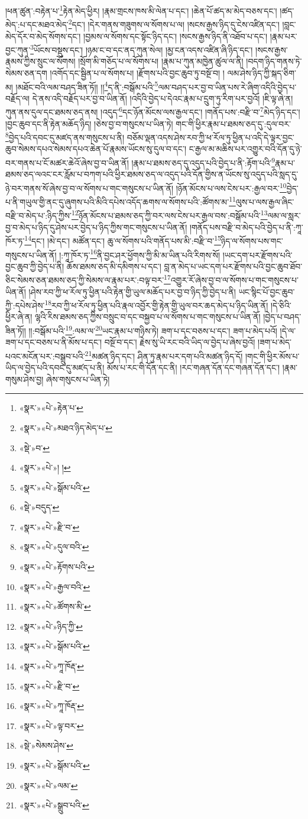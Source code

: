 །ཕན་ཚུན་:བརྟེན་པ་\footnote{«སྣར་»«པེ་»རྟེན་པ་}རྟེན་མེད་ཕྱིར། །རྣམ་གྲངས་ཁས་མི་ལེན་པ་དང་། །ཆེན་པོ་ཚད་མ་མེད་བཅས་དང་། །ཚད་མེད་:པ་དང་མཐའ་མེད་\footnote{«སྣར་»«པེ་»མཐའ་ཉིད་མེད་པ་}དང་། །དེར་གནས་གཟུགས་ལ་སོགས་པ་ལ། །སངས་རྒྱས་ཉིད་དུ་ངེས་འཛིན་དང་། །བླང་མེད་དོར་བ་མེད་སོགས་དང་། །བྱམས་ལ་སོགས་དང་སྟོང་ཉིད་དང་། །སངས་རྒྱས་ཉིད་ནི་འཐོབ་པ་དང་། །རྣམ་པར་བྱང་ཀུན་\footnote{«སྡེ་»བ་}ཡོངས་བསྡུས་དང་། །ཉམ་ང་བ་དང་ནད་ཀུན་སེལ། །མྱ་ངན་འདས་འཛིན་ཞི་ཉིད་དང་། །སངས་རྒྱས་རྣམས་ཀྱིས་སྲུང་ལ་སོགས། །སྲོག་མི་གཅོད་པ་ལ་སོགས་པ། །རྣམ་པ་ཀུན་མཁྱེན་ཚུལ་ལ་ནི། །བདག་ཉིད་གནས་ཏེ་སེམས་ཅན་དག །འགོད་དང་སྦྱིན་པ་ལ་སོགས་པ། །རྫོགས་པའི་བྱང་ཆུབ་ཏུ་བསྔོ་བ། །
ལམ་ཤེས་ཉིད་ཀྱི་སྐད་ཅིག་མ། །མཐོང་བའི་ལམ་བཤད་ཟིན་ཏོ།། །།\footnote{«སྣར་»«པེ་»། །}ད་ནི་:བསྒོམ་པའི་\footnote{«སྣར་»«པེ་»སྒོམ་པའི་}ལམ་བཤད་པར་བྱ་བ་ཡིན་པས་རེ་ཞིག་འདིའི་བྱེད་པ་བརྗོད་ལ། དེ་ནས་འདི་བརྗོད་པར་བྱ་བ་ཡིན་ནོ། །འདིའི་བྱེད་པ་དེའང་རྣམ་པ་དྲུག་ཏུ་རིག་པར་བྱའོ། །ཇི་ལྟ་ཞེ་ན། ཀུན་ནས་དུལ་དང་ཐམས་ཅད་ནས། །འདུད་\footnote{«སྡེ་»བདུད་}དང་ཉོན་མོངས་ལས་རྒྱལ་དང་། །གནོད་པས་:བརྫི་བ་\footnote{«སྣར་»«པེ་»རྫི་བ་}མེད་ཉིད་དང་། །བྱང་ཆུབ་དང་ནི་རྟེན་མཆོད་ཉིད། །ཅེས་བྱ་བ་གསུངས་པ་ཡིན་ཏེ། གང་གི་ཕྱིར་རྣམ་པ་ཐམས་ཅད་དུ་:དུལ་བར་\footnote{«སྣར་»«པེ་»དུལ་བའི་}བྱེད་པའི་དབང་དུ་མཛད་ནས་གསུངས་པ་ནི། བཅོམ་ལྡན་འདས་ཤེས་རབ་ཀྱི་ཕ་རོལ་ཏུ་ཕྱིན་པ་འདི་དེ་ལྟར་བྱང་ཆུབ་སེམས་དཔའ་སེམས་དཔའ་ཆེན་པོ་རྣམས་ཡོངས་སུ་དུལ་བ་དང་། ང་རྒྱལ་མ་མཆིས་པར་འགྱུར་བའི་དོན་དུ་ཉེ་བར་གནས་པ་ངོ་མཚར་ཆེའོ་ཞེས་བྱ་བ་ཡིན་ནོ། །རྣམ་པ་ཐམས་ཅད་དུ་འདུད་པའི་བྱེད་པ་ནི་:རྟོག་པའི་\footnote{«སྣར་»«པེ་»རྟོགས་པའི་}རྣམ་པ་ཐམས་ཅད་ལའང་ངར་རློམ་པ་བཀག་པའི་ཕྱིར་ཐམས་ཅད་ལ་འདུད་པའི་དོན་གྱིས་ན་ཡོངས་སུ་འདུད་པའི་སླད་དུ་ཉེ་བར་གནས་སོ་ཞེས་བྱ་བ་ལ་སོགས་པ་གང་གསུངས་པ་ཡིན་ནོ། །ཉོན་མོངས་པ་ལས་ངེས་པར་:རྒྱལ་བར་\footnote{«སྣར་»«པེ་»རྒྱལ་བའི་}བྱེད་པ་ནི་གཡུལ་གྱི་ནང་དུ་ཞུགས་པའི་མིའི་དཔེས་འདོད་ཆགས་ལ་སོགས་པའི་:ཚོགས་མ་\footnote{«སྣར་»«པེ་»ཚོགས་མི་}ལུས་པ་ལས་རྒྱལ་ཞིང་བརྫི་བ་མེད་པ་:ཉིད་ཀྱིས་\footnote{«སྣར་»«པེ་»ཉིད་ཀྱི་}ཉོན་མོངས་པ་ཐམས་ཅད་ཀྱི་བར་ལས་ངེས་པར་རྒྱལ་བས་:བསྒོམ་པའི་\footnote{«སྣར་»«པེ་»སྒོམ་པའི་}ལམ་ལ་སླར་བྱ་བ་མེད་པ་ཉིད་དུ་ཤེས་པར་བྱེད་པ་ཉིད་ཀྱིས་གང་གསུངས་པ་ཡིན་ནོ། །གནོད་པས་བརྫི་བ་མེད་པའི་བྱེད་པ་ནི་:ཀཱ་ཁོར་ཏ་\footnote{«སྣར་»«པེ་»ཀཱ་ཁོརྡ་}དང་། །མེ་དང་། མཚོན་དང་། ཆུ་ལ་སོགས་པའི་གནོད་པས་མི་:བརྫི་བ་\footnote{«སྣར་»«པེ་»རྫི་བ་}ཉིད་ལ་སོགས་པས་གང་གསུངས་པ་ཡིན་ནོ། །:ཀཱ་ཁོར་ཏ་\footnote{«སྣར་»«པེ་»ཀཱ་ཁོརྡ་}ནི་བྱང་ཤར་ཕྱོགས་ཀྱི་མི་མ་ཡིན་པའི་རིགས་སོ། །ཡང་དག་པར་རྫོགས་པའི་བྱང་ཆུབ་ཀྱི་བྱེད་པ་ནི། ཆོས་ཐམས་ཅད་མི་དམིགས་པ་དང་། བླ་ན་མེད་པ་ཡང་དག་པར་རྫོགས་པའི་བྱང་ཆུབ་ཐོབ་ཅིང་སེམས་ཅན་ཐམས་ཅད་ཀྱི་སེམས་ལ་རྣམ་པར་:བལྟ་བར་\footnote{«སྣར་»«པེ་»ལྟ་བར་}འགྱུར་རོ་ཞེས་བྱ་བ་ལ་སོགས་པ་གང་གསུངས་པ་ཡིན་ནོ། །ཤེས་རབ་ཀྱི་ཕ་རོལ་ཏུ་ཕྱིན་པའི་རྟེན་གྱི་ཡུལ་མཆོད་པར་བྱ་བ་ཉིད་ཀྱི་བྱེད་པ་ནི། ཡང་སྙིང་པོ་བྱང་ཆུབ་ཀྱི་:དཔེས་ཤེས་\footnote{«སྡེ་»སེམས་ཤེས་}རབ་ཀྱི་ཕ་རོལ་ཏུ་ཕྱིན་པའི་རྣལ་འབྱོར་གྱི་རྟེན་གྱི་ཡུལ་བར་ཆད་མེད་པ་ཉིད་ཡིན་ནོ། །དེ་ཅིའི་ཕྱིར་ཞེ་ན། ལྷའི་རིས་ཐམས་ཅད་ཀྱིས་བསྲུང་བ་དང་བསྐྱབ་པ་ལ་སོགས་པ་གང་གསུངས་པ་ཡིན་ནོ། །བྱེད་པ་བཤད་ཟིན་ཏོ།། །།:བསྒོམ་པའི་\footnote{«སྣར་»«པེ་»སྒོམ་པའི་}:ལམ་ལ་\footnote{«སྣར་»«པེ་»ལམ་}ཡང་རྣམ་པ་གཉིས་ཏེ། ཟག་པ་དང་བཅས་པ་དང་། ཟག་པ་མེད་པའོ། །དེ་ལ་ཟག་པ་དང་བཅས་པ་ནི་མོས་པ་དང་། བསྔོ་བ་དང་། རྗེས་སུ་ཡི་རང་བའི་ཡིད་ལ་བྱེད་པ་ཞེས་བྱའོ། །ཟག་པ་མེད་པའང་མངོན་པར་:བསྒྲུབ་པའི་\footnote{«སྣར་»«པེ་»སྒྲུབ་པའི་}མཚན་ཉིད་དང་། ཤིན་ཏུ་རྣམ་པར་དག་པའི་མཚན་ཉིད་དོ། །གང་གི་ཕྱིར་མོས་པ་ཡིད་ལ་བྱེད་པའི་དབང་དུ་མཛད་པ་ནི། མོས་པ་རང་གི་དོན་དང་ནི། །རང་གཞན་དོན་དང་གཞན་དོན་དང་། །རྣམ་གསུམ་ཤེས་བྱ། ཞེས་གསུངས་པ་ཡིན་ཏེ། 
